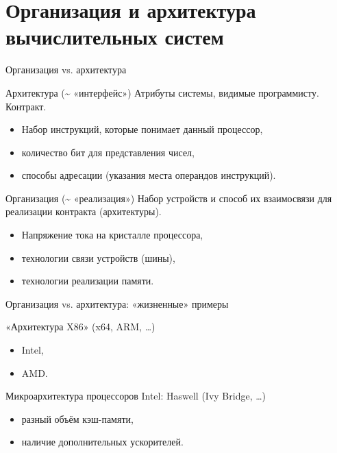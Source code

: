 \section{Организация и архитектура вычислительных систем}

\begin{frame}{Организация vs. архитектура}

\pause
\begin{block}{Архитектура (\textasciitilde{} «интерфейс»)}
Атрибуты системы, видимые программисту. Контракт.

\pause
\begin{itemize}
	\item Набор инструкций, которые понимает данный процессор,
	\item количество бит для представления чисел,
	\item способы адресации (указания места операндов инструкций).
\end{itemize}
\end{block}

\pause
\begin{block}{Организация (\textasciitilde{} «реализация»)}
Набор устройств и способ их взаимосвязи для реализации
контракта (архитектуры).

\pause
\begin{itemize}
	\item Напряжение тока на кристалле процессора,
	\item технологии связи устройств (шины),
	\item технологии реализации памяти.
\end{itemize}
\end{block}
\end{frame}

\begin{frame}{Организация vs. архитектура: «жизненные» примеры}

\pause
\begin{block}{«Архитектура X86» (x64, ARM, …)}
\begin{itemize}
    \item Intel,
    \item AMD.
\end{itemize}
\end{block}

\pause
\begin{block}{Микроархитектура процессоров Intel: Haswell (Ivy Bridge, …)}
\begin{itemize}
    \item разный объём кэш-памяти,
    \item наличие дополнительных ускорителей.
\end{itemize}
\end{block}

\end{frame}


